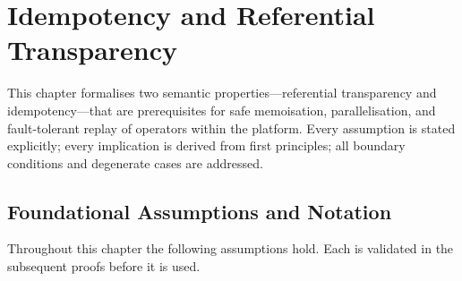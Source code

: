 \documentclass[12pt,openany]{book}
\numberwithin{equation}{chapter}
\theoremstyle{plain}
\theoremstyle{definition}
\theoremstyle{remark}
\numberwithin{equation}{chapter}
\theoremstyle{plain}
\begin{document}
\chapter{Idempotency and Referential Transparency}
\label{ch:idempotency}

\noindent
This chapter formalises two semantic properties---referential transparency
and idempotency---that are prerequisites for safe memoisation,
parallelisation, and fault-tolerant replay of operators within the
platform.  Every assumption is stated explicitly; every implication is
derived from first principles; all boundary conditions and degenerate
cases are addressed.

\section{Foundational Assumptions and Notation}
\label{sec:idemp-assumptions}

\noindent
Throughout this chapter the following assumptions hold.  Each is
validated in the subsequent proofs before it is used.
\end{document}
